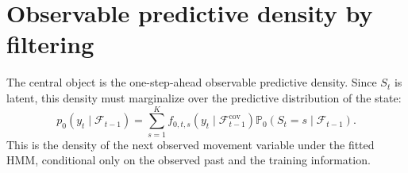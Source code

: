\documentclass[pdflatex,sn-basic]{sn-jnl}
\theoremstyle{thmstyleone}
\theoremstyle{thmstyletwo}
\theoremstyle{thmstylethree}
\newcommand{\Pbb}{\mathbb P}
\newcommand{\1}{\mathbf 1}
\newcommand{\calF}{\mathcal F}
\begin{document}
\section{Observable predictive density by filtering}
\label{sec:filtering}

The central object is the one-step-ahead observable predictive density. Since $S_t$ is latent, this density must marginalize over the predictive distribution of the state:
\begin{equation}
\label{eq:p0_predictive}
 p_0(y_t\mid \calF_{t-1})
  =\sum_{s=1}^K f_{0,t,s}(y_t\mid\calF_{t-1}^{\mathrm{cov}})\Pbb_0(S_t=s\mid \calF_{t-1}).
\end{equation}
This is the density of the next observed movement variable under the fitted HMM, conditional only on the observed past and the training information.
\end{document}

